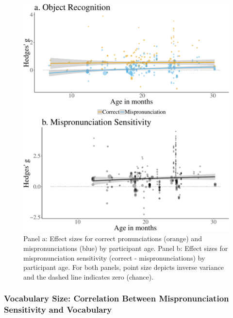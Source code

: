 \documentclass[man]{apa6}
\theoremstyle{definition}
\theoremstyle{definition}
\theoremstyle{definition}
\theoremstyle{remark}
\begin{document}
\begin{figure}
\centering
\includegraphics{VonHolzenBergmann_MPMetaAnalysis_files/figure-latex/PlotMPEffect-1.pdf}
\caption{\label{fig:PlotMPEffect}Panel a: Effect sizes for correct
pronunciations (orange) and mispronunciations (blue) by participant age.
Panel b: Effect sizes for mispronunciation sensitivity (correct -
mispronunciations) by participant age. For both panels, point size
depicts inverse variance and the dashed line indicates zero (chance).}
\end{figure}

\subsubsection{Vocabulary Size: Correlation Between Mispronunciation
Sensitivity and
Vocabulary}\label{vocabulary-size-correlation-between-mispronunciation-sensitivity-and-vocabulary}
\end{document}
